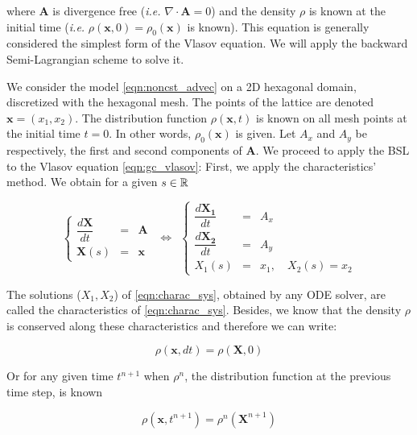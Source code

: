 \documentclass[proc]{edpsmath}
\begin{document}
where $\mathbf{A}$ is divergence free (\emph{i.e.} $\nabla \cdot \mathbf{A} = 0$) and the density $\rho$ is known at the initial time (\emph{i.e.} $\rho(\mathbf{x}, 0) = \rho_0(\mathbf{x})$ is known). This equation is generally considered the simplest form of the Vlasov equation. We will apply the backward Semi-Lagrangian scheme to solve it.


We consider the model \eqref{eqn:noncst_advec} on a 2D hexagonal domain, discretized with the hexagonal mesh. The points of the lattice are denoted $\mathbf{x}=(x_1, x_2)$. The distribution function $\rho(\mathbf{x},t)$ is known on all mesh points at the initial time $t=0$. In other words, $\rho_0(\mathbf{x})$ is given. Let $A_x$ and $A_y$ be respectively, the first and second components of $\mathbf{A}$. We proceed to apply the BSL to the Vlasov equation \eqref{eqn:gc_vlasov}: First, we apply the characteristics' method. We obtain for a given $s \in \mathbb{R} $

\begin{equation}
	\label{eqn:charac_sys}
	\left\lbrace
	\begin{array}{lcl}
	\displaystyle \dfrac{d \mathbf{X}}{dt} &=& \mathbf{A}\\[0.3cm]
	\displaystyle \mathbf{X}(s) &=& \mathbf{x}
	\end{array}\right.
~~\Longleftrightarrow ~~
	\left\lbrace
	\begin{array}{lcl}
	\displaystyle \dfrac{d \mathbf{X_1}}{dt} &=& A_x\\[0.3cm]
	\displaystyle \dfrac{d \mathbf{X_2}}{dt} &=& A_y\\[0.3cm]
	\displaystyle X_1(s) &=& x_1, \quad   X_2(s) = x_2
	\end{array}\right.
\end{equation}

The solutions ($X_1, X_2$) of \eqref{eqn:charac_sys}, obtained by any ODE solver, are called the characteristics of \eqref{eqn:charac_sys}. Besides, we know that the density $\rho$ is conserved along these characteristics and therefore we can write:

\begin{equation}
	\rho(\mathbf{x}, dt) = \rho(\mathbf{X}, 0)
\end{equation}

Or for any given time $t^{n+1}$ when $\rho^n$, the distribution function at the previous time step, is known

\begin{equation}
\label{eqn:SL_eqn}
	\rho(\mathbf{x}, t^{n+1}) = \rho^n(\mathbf{X}^{n+1})
\end{equation}
\end{document}
